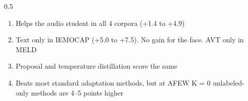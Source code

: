 \begin{frame}{}
\begin{columns}[T]
\begin{column}{0.5\textwidth}
{\begin{enumerate}
\end{enumerate}
}{%
\begin{enumerate}
\item Helps the audio student in all 4 corpora (+1.4 to +4.9)
\item Text only in IEMOCAP (+5.0 to +7.5). No gain for the face. AVT only in MELD
\item Proposal and temperature distillation score the same
\item Beats most standard adaptation methods, but at AFEW K = 0 unlabeled-only methods are 4--5 points higher
\end{enumerate}
}
\end{column}
\end{columns}
\end{frame}

